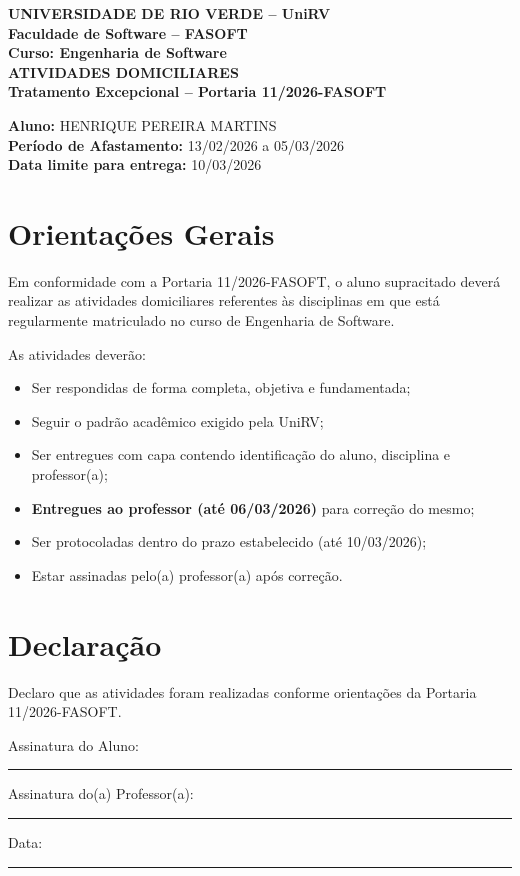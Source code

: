 \documentclass[12pt,a4paper]{article}
\begin{document}
\begin{center}
\textbf{\large UNIVERSIDADE DE RIO VERDE – UniRV}\\
\textbf{Faculdade de Software – FASOFT}\\[0.5cm]
\textbf{Curso: Engenharia de Software}\\[1cm]

\textbf{\Large ATIVIDADES DOMICILIARES}\\
\textbf{Tratamento Excepcional – Portaria 11/2026-FASOFT}\\[1cm]
\end{center}

\noindent
\textbf{Aluno:} HENRIQUE PEREIRA MARTINS\\
\textbf{Período de Afastamento:} 13/02/2026 a 05/03/2026\\
\textbf{Data limite para entrega:} 10/03/2026\\


\section*{Orientações Gerais}

Em conformidade com a Portaria 11/2026-FASOFT, o aluno supracitado deverá realizar as atividades domiciliares referentes às disciplinas em que está regularmente matriculado no curso de Engenharia de Software.

As atividades deverão:

\begin{itemize}
    \item Ser respondidas de forma completa, objetiva e fundamentada;
    \item Seguir o padrão acadêmico exigido pela UniRV;
    \item Ser entregues com capa contendo identificação do aluno, disciplina e professor(a);
    \item \textbf{Entregues ao professor (até 06/03/2026)} para correção do mesmo;
    \item Ser protocoladas dentro do prazo estabelecido (até 10/03/2026);
    \item Estar assinadas pelo(a) professor(a) após correção.
\end{itemize}

\section*{Declaração}

Declaro que as atividades foram realizadas conforme orientações da Portaria 11/2026-FASOFT.


\noindent
Assinatura do Aluno: \rule{8cm}{0.4pt}

\vspace{1cm}

\noindent
Assinatura do(a) Professor(a): \rule{8cm}{0.4pt}

\vspace{1cm}

\noindent
Data: \rule{4cm}{0.4pt}
\end{document}
